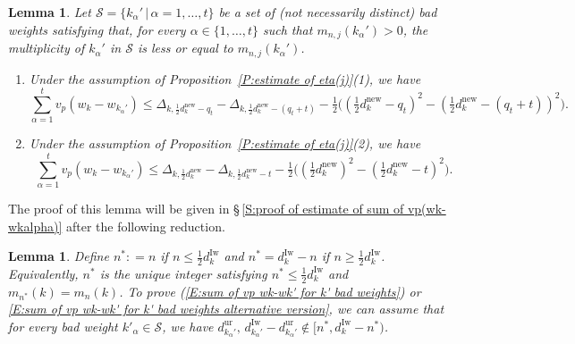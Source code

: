 \documentclass[12pt]{amsart}
\newtheorem{lemma}[subsection]{Lemma}
\theoremstyle{definition}
\numberwithin{equation}{subsection}
\def\calS{\mathcal{S}}
\newcommand{\new}{\mathrm{new}}
\newcommand{\Iw}{\mathrm{Iw}}
\newcommand{\ur}{\mathrm{ur}}
\begin{document}
	\begin{lemma}\label{L:estimate of sum of vp(wk-wkalpha) for kalpha bad weights}
Let $\calS=\{k_\alpha'\,|\,\alpha=1,\dots,t \}$ be a set of (not necessarily distinct) bad weights satisfying that, for every $\alpha \in \{1,\dots, t\}$ such that  $m_{n,j}(k_\alpha')>0$, the multiplicity of $k_\alpha'$ in $\calS$ is less or equal to $m_{n,j}(k_\alpha')$.
		\begin{enumerate}
			\item Under the assumption of Proposition~\ref{P:estimate of eta(j)}(1), we have 
			\begin{equation}
			\label{E:sum of vp wk-wk' for k' bad weights}
			\sum_{\alpha=1}^t v_p(w_k-w_{k_\alpha'})\leq \Delta_{k,\frac 12 d_k^\new-q_t}-\Delta_{k,\tfrac 12 d_k^\new-(q_t+t)}-\tfrac 12\big((\tfrac 12d_k^\new-q_t)^2-(\tfrac 12d_k^\new- (q_t+t))^2 \big).
			\end{equation}
			\item Under the assumption of Proposition~\ref{P:estimate of eta(j)}(2), we have
			\begin{equation}
			\label{E:sum of vp wk-wk' for k' bad weights alternative version}
			\sum_{\alpha=1}^t v_p(w_k-w_{k_\alpha'})\leq \Delta_{k,\frac 12 d_k^\new}-\Delta_{k,\frac 12 d_k^\new-t}-\tfrac 12\big((\tfrac 12d_k^\new)^2-(\tfrac 12d_k^\new- t)^2 \big).
			\end{equation}
		\end{enumerate}
	\end{lemma}
The proof of this lemma will be given in \S\,\ref{S:proof of estimate of sum of vp(wk-wkalpha)} after the following reduction.   
	\begin{lemma}\label{L:reduction of lemma on sum of vp wk-wk' bad weights}Define $n^*: = n $ if $n \leq \frac 12d_k^\Iw$ and $n^* = d_k^\Iw - n$ if $n \geq \frac 12d_k^\Iw$. Equivalently, $n^*$ is the unique integer satisfying $n^*\leq \frac 12 d_k^\Iw$ and  $m_{n^*}(k) = m_n(k)$.
To prove (\ref{E:sum of vp wk-wk' for k' bad weights}) or \eqref{E:sum of vp wk-wk' for k' bad weights alternative version}, we can assume that for every bad weight $k'_\alpha \in \calS$, we have $d_{k_\alpha'}^\ur, \, d_{k_\alpha'}^\Iw-d_{k_\alpha'}^\ur \notin [n^\ast,d_k^\Iw-n^\ast)$.
	\end{lemma}
\end{document}
